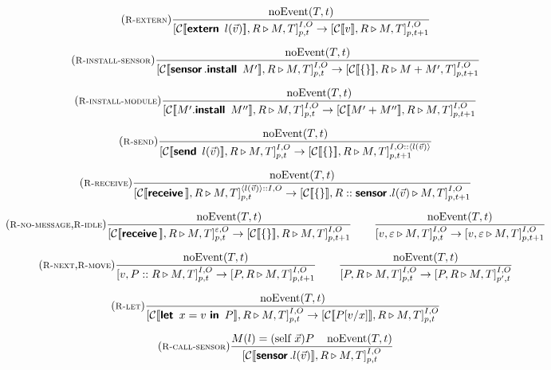 \documentclass[copyright,creativecommons]{eptcs}
\newcommand{\keyw}[1]{\textbf{\textsf{#1}}\,}
\newcommand{\installk}{\keyw{install}}
\newcommand{\ink}{\keyw{in}}
\newcommand{\systemk}{\keyw{extern}}
\newcommand{\letk}{\keyw{let}}
\newcommand{\sendk}{\keyw{send}}
\newcommand{\receivek}{\keyw{receive}}
\newcommand{\branek}{\keyw{sensor}}
\newcommand{\selfk}{\text{self}}
\newcommand{\sensor}[6]{[{#1} \triangleright {#2}]^{{#3}, {#4}}_{{#5}, {#6}}}
\newcommand{\invk}[3]{{#1}.{#2}({#3})}
\newcommand{\system}[1]{\systemk\ {#1}}
\newcommand{\systemd}{\system {\msgd}}
\newcommand{\send}[1]{\sendk\ {#1}}
\newcommand{\sendd}{\send {\msgd}}
\newcommand{\msg}[2]{{#1}({#2})}
\newcommand{\msgd}{\msg l {\vec v}}
\newcommand{\receivedd}{\receivek}
\newcommand{\install}[2]{{#1}.\installk\ {#2}}
\newcommand{\Let}[3]{\letk\ {#1} = {#2}\ \ink\ {#3}}
\def\obj#1{\{#1\}}
\newcommand{\subs}[2]{[{#1}/{#2}]}
\newcommand{\reduces}{\rightarrow}
\newcommand{\mkRrule}[1]{{\footnotesize \textsc{R-#1}}}
\newcommand{\RinstallS}{\mkRrule{install-sensor}}
\newcommand{\RinstallM}{\mkRrule{install-module}}
\newcommand{\Rlet}{\mkRrule{let}}
\newcommand{\RcallS}{\mkRrule{call-sensor}}
\newcommand{\Rsend}{\mkRrule{send}}
\newcommand{\Rreceive}{\mkRrule{receive}}
\newcommand{\Rsystem}{\mkRrule{extern}}
\newcommand{\Rnext}{\mkRrule{next}}
\newcommand{\Ridle}{\mkRrule{idle}}
\newcommand{\RreceiveN}{\mkRrule{no-message}}
\newcommand{\Rmove}{\mkRrule{move}}
\newcommand{\rulespace}{0.2cm}
\newcommand{\noEvent}[2]{\mathop{\mathrm{noEvent}}\nolimits ({#1}, {#2})}
\newcommand{\noEventd}{\noEvent T t}
\begin{document}
\begin{figure}
\begin{gather*}
    \tag{\Rsystem}
    \frac{
      \noEventd
    }{
      \sensor {\context{\systemd},R} {M,T} I O p t 
      \reduces
      \sensor {\context{v},R} {M, T} I O p {t+1} 
    }
\\[\rulespace]
    \tag{\RinstallS}
    \frac{
      \noEventd
    }
    {
      \sensor {\context{\install {\branek} {M'}},R} {M, T} I O p t 
      \reduces
      \sensor {\context{\obj{}},R} {M+M', T} I O  p {t+1} 
    }
    \\[\rulespace]
    \tag{\RinstallM}
    \frac{
      \noEventd
    }
    {
      \sensor {\context{\install {M'} {M''}},R} {M, T} I O p t 
      \reduces
      \sensor {\context{M' + M''},R} {M, T} I O  p {t+1} 
    }
    \\[\rulespace]
    \tag{\Rsend}
    \frac{
      \noEventd
    }
    {
      \sensor {\context{\sendd},R} {M, T} I O p t 
      \reduces
      \sensor {\context{\obj{}},R} {M, T} I {O::\langle \msgd \rangle} p {t+1}
    }
    \\[\rulespace]
    \tag{\Rreceive}
    \frac{
       \noEventd
    }
    {
      \sensor {\context{\receivedd},R} {M, T} {\langle \msgd \rangle :: I} O p t 
      \reduces
      \sensor {\context{\obj{}},R:: \invk \branek l {\vec v}} {M, T} I O p {t+1}
    }
   \\[\rulespace]
    \tag{\RreceiveN,\Ridle}
    \frac{
       \noEventd
    }
    {
      \sensor {\context{\receivedd},R} {M, T} {\varepsilon} O p t 
      \reduces
      \sensor {\context{\obj{}},R} {M, T} I O p {t+1}
    }
    \qquad
    \frac{
      \noEventd
    }
    {
      \sensor {v,\varepsilon} {M, T} I O p t 
      \reduces
      \sensor {v,\varepsilon} {M, T} I O p {t+1}
    }
   \\[\rulespace]
    \tag{\Rnext,\Rmove}
    \frac{
      \noEventd
    }
    {
      \sensor {v,P::R} {M, T} I O p t 
      \reduces
      \sensor {P,R} {M, T} I O p {t+1}
    }
    \qquad
    \frac{
      \noEventd
    }
    {
      \sensor {P,R} {M, T} I O p t 
      \reduces
      \sensor {P,R} {M, T} I O {p'} t
    }
    \\[\rulespace]
    \tag{\Rlet}
    \frac{
      \noEventd
    }
    {
      \sensor {\context{\Let x v P},R} {M, T} I O p t
      \reduces
      \sensor {\context{P\subs v x},R} {M, T} I O p t 
    }
    \\[\rulespace]
    \tag{\RcallS}
     \frac{
      M(l) = (\selfk\ \vec x) P
       \quad 
       \noEventd
     }{
       \sensor {\context{\invk \branek l {\vec v}},R} {M,T} I O p t 
}
\end{gather*}
\end{figure}
\end{document}
